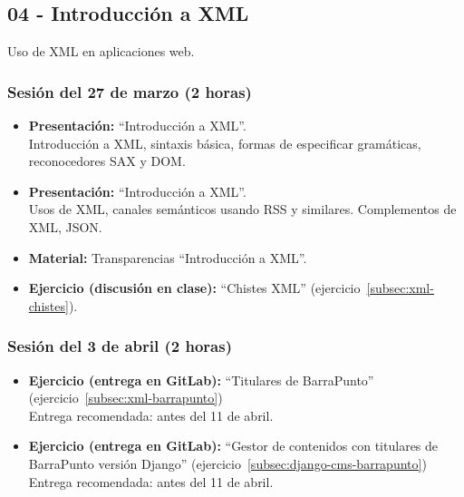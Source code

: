\documentclass[a4paper,12pt]{article}
\begin{document}
\subsection{04 - Introducción a XML}

Uso de XML en aplicaciones web.

\subsubsection{Sesión del 27 de marzo (2 horas)}

\begin{itemize}
\item \textbf{Presentación:} ``Introducción a XML''. \\
 Introducción a XML, sintaxis básica, formas de especificar gramáticas, reconocedores SAX y DOM.
\item \textbf{Presentación:} ``Introducción a XML''. \\
Usos de XML, canales semánticos usando RSS y similares. Complementos de XML, JSON.
\item \textbf{Material:} Transparencias ``Introducción a XML''.
\item \textbf{Ejercicio (discusión en clase):} ``Chistes XML'' (ejercicio~\ref{subsec:xml-chistes}).
\end{itemize}

\subsubsection{Sesión del 3 de abril (2 horas)}

\begin{itemize}
\item \textbf{Ejercicio (entrega en GitLab):} ``Titulares de BarraPunto'' (ejercicio~\ref{subsec:xml-barrapunto}) \\
  Entrega recomendada: antes del 11 de abril.
\item \textbf{Ejercicio (entrega en GitLab):} ``Gestor de contenidos con titulares de BarraPunto versión Django'' (ejercicio~\ref{subsec:django-cms-barrapunto}) \\
  Entrega recomendada: antes del 11 de abril.
\end{itemize}
\end{document}
